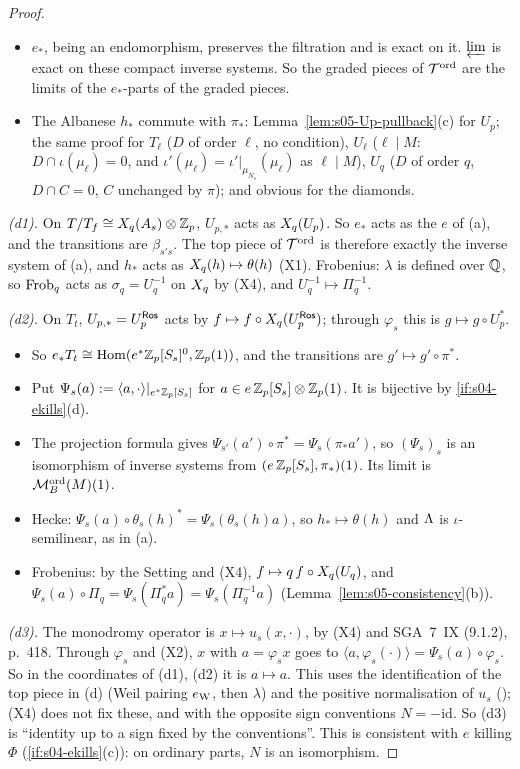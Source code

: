 \begin{proof}
\begin{itemize}
\item $e_*$, being an endomorphism, preserves the filtration and is exact on it. $\varprojlim$ is exact on these compact inverse systems. So the graded pieces of
  $\mathcal{T}^{\mathrm{ord}}$ are the limits of the $e_*$-parts of the graded pieces.
\item The Albanese $h_*$ commute with $\pi_*$: Lemma~\ref{lem:s05-Up-pullback}(c) for $U_p$; the same proof for $T_\ell$ ($D$ of order $\ell$, no condition), $U_\ell$ ($\ell\mid M$: $D\cap\iota(\mu_\ell)=0$, and
  $\iota'(\mu_\ell)=\iota'|_{\mu_{N_s}}(\mu_\ell)$ as $\ell\mid M$), $U_q$ ($D$ of order $q$, $D\cap C=0$, $C$ unchanged by $\pi$); and obvious for the diamonds.
\end{itemize}
\emph{(d1).} On $T/T_f\cong X_q(A_s)\otimes\mathbb{Z}_p$, $U_{p,*}$ acts as $X_q(U_p)$. So $e_*$ acts as the $e$ of (a), and the transitions are $\beta_{s's}$.
The top piece of $\mathcal{T}^{\mathrm{ord}}$ is therefore exactly the inverse system of (a), and $h_*$ acts as $X_q(h)\mapsto\theta(h)$ (X1).
Frobenius: $\lambda$ is defined over $\mathbb{Q}$, so $\mathrm{Frob}_q$ acts as $\sigma_q=U_q^{-1}$ on $X_q$ by (X4), and $U_q^{-1}\mapsto\Pi_q^{-1}$.

\emph{(d2).} On $T_t$, $U_{p,*}=U_p^{\mathsf{Ros}}$ acts by $f\mapsto f\circ X_q(U_p^{\mathsf{Ros}})$; through $\varphi_s$ this is $g\mapsto g\circ U_p^*$.
\begin{itemize}
\item So $e_*T_t\cong\operatorname{Hom}(e^*\mathbb{Z}_p[S_s]^0,\mathbb{Z}_p(1))$, and the transitions are $g'\mapsto g'\circ\pi^*$.
\item Put $\Psi_s(a):=\langle a,\cdot\rangle|_{e^*\mathbb{Z}_p[S_s]}$ for $a\in e\,\mathbb{Z}_p[S_s]\otimes\mathbb{Z}_p(1)$. It is bijective by \ref{if:s04-ekills}(d).
\item The projection formula gives $\Psi_{s'}(a')\circ\pi^*=\Psi_s(\pi_*a')$, so $(\Psi_s)_s$ is an isomorphism of inverse systems from $(e\,\mathbb{Z}_p[S_s],\pi_*)(1)$.
  Its limit is $\mathcal{M}^{\mathrm{ord}}_B(M)(1)$.
\item Hecke: $\Psi_s(a)\circ\theta_s(h)^*=\Psi_s(\theta_s(h)a)$, so $h_*\mapsto\theta(h)$ and $\Lambda$ is $\iota$-semilinear, as in (a).
\item Frobenius: by the Setting and (X4), $f\mapsto q\,f\circ X_q(U_q)$, and $\Psi_s(a)\circ\Pi_q=\Psi_s(\Pi_q^*a)=\Psi_s(\Pi_q^{-1}a)$
  (Lemma~\ref{lem:s05-consistency}(b)).
\end{itemize}

\emph{(d3).} The monodromy operator is $x\mapsto u_s(x,\cdot)$, by (X4) and SGA~7~IX (9.1.2), p.~418. Through $\varphi_s$ and (X2), $x$ with $a=\varphi_sx$ goes to
$\langle a,\varphi_s(\cdot)\rangle=\Psi_s(a)\circ\varphi_s$. So in the coordinates of (d1), (d2) it is $a\mapsto a$. This uses the identification of the top piece in (d) (Weil pairing $e_{\rm W}$, then $\lambda$) and
the positive normalisation of $u_s$ (); (X4) does not fix these, and with the opposite sign conventions $N=-\mathrm{id}$.
So (d3) is ``identity up to a sign fixed by the conventions''. This is consistent with $e$
killing $\Phi$ (\ref{if:s04-ekills}(c)): on ordinary parts, $N$ is an isomorphism.


\end{proof}
